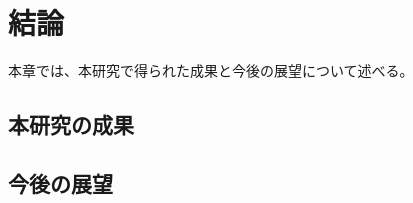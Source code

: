 \chapter{結論}
\label{chap:conclusion}

本章では、本研究で得られた成果と今後の展望について述べる。

\newpage

\section{本研究の成果}

\section{今後の展望}
